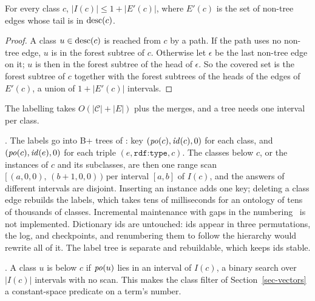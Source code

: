 \begin{lemma}[Size]\label{lem-size}
For every class $c$, $|I(c)|\le 1+|E'(c)|$, where $E'(c)$ is the set of non-tree edges whose tail is in $\mathrm{desc}(c)$.
\end{lemma}
\iffull
\begin{proof}
A class $u\in\mathrm{desc}(c)$ is reached from $c$ by a path.
If the path uses no non-tree edge, $u$ is in the forest subtree of $c$.
Otherwise let $\epsilon$ be the last non-tree edge on it; $u$ is then in the forest
subtree of the head of $\epsilon$.
So the covered set is the forest subtree of $c$ together with the forest
subtrees of the heads of the edges of $E'(c)$, a union of $1+|E'(c)|$
intervals.
\end{proof}
\fi

The labelling takes $O(|\mathcal{C}|+|E|)$ plus the merges, and a tree needs
one interval per class.

.
The labels go into B+ trees of \sys: key $(\mathit{po}(c),\mathit{id}(c),0)$ for each
class, and $(\mathit{po}(c),\mathit{id}(e),0)$ for each triple $(e,\texttt{rdf:type},c)$.
The classes below $c$, or the instances of $c$ and its subclasses, are then
one range scan $[\,(a,0,0),\,(b{+}1,0,0)\,)$ per interval $[a,b]$ of $I(c)$,
and the answers of different intervals are disjoint.
Inserting an instance adds one key; deleting a class edge rebuilds the labels,
which takes tens of milliseconds for an ontology of tens of thousands of
classes.
Incremental maintenance with gaps in the numbering~\cite{agrawal1989} is not
implemented.
Dictionary ids are untouched: ids appear in three permutations, the log, and
checkpoints, and renumbering them to follow the hierarchy would rewrite all of
it.
The label tree is separate and rebuildable, which keeps ids stable.

.
A class $u$ is below $c$ if $\mathit{po}(u)$ lies in an interval of $I(c)$, a binary
search over $|I(c)|$ intervals with no scan.
This makes the class filter of Section~\ref{sec-vectors} a constant-space
predicate on a term's number.
